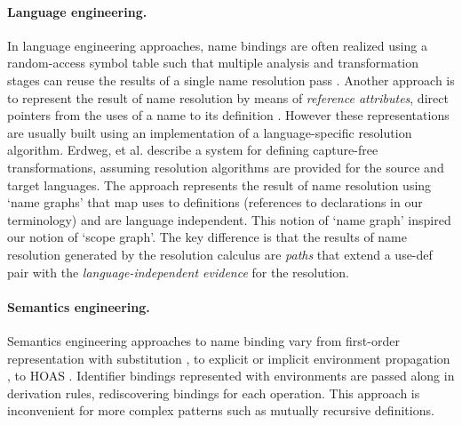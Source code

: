 \paragraph{Language engineering.}

In language engineering approaches, name bindings are often realized using a random-access symbol table such that multiple analysis and transformation stages can reuse the results of a single name resolution pass \cite{AhoSU86}. Another approach is to represent the result of name resolution by means of \emph{reference attributes}, direct pointers from
the uses of a name to its definition \cite{HedinM03}. However these representations are usually built using an implementation of a language-specific resolution algorithm. 
Erdweg, et al. \cite{ErdwegSD14} describe a system for defining capture-free transformations,
assuming resolution algorithms are provided for the source and target languages. The approach represents the result of name resolution using ‘name graphs’ that map uses to definitions (references to declarations in our terminology) and are language independent.
This notion of ‘name graph’ inspired our notion of ‘scope graph’. The key difference is that the results of name resolution generated by the resolution calculus are \emph{paths} that extend a use-def pair with the \emph{language-independent evidence} for the resolution.

\paragraph{Semantics engineering.}

Semantics engineering approaches to name binding vary from first-order
representation with substitution \cite{KleinCDEFFMRTF12}, to explicit or
implicit environment propagation
\cite{Pierce2002,Mosses-JLAP-2004,ChurchillMT14}, to HOAS
\cite{Chlipala10}. Identifier bindings represented with environments are
passed along in derivation rules, rediscovering bindings for each
operation. This approach is inconvenient for more complex patterns such
as mutually recursive definitions.
